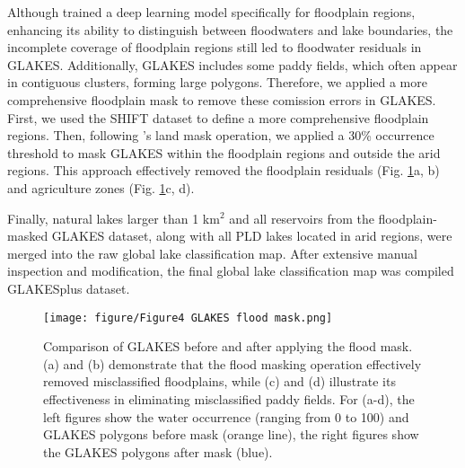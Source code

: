 \documentclass[preprint,12pt,authoryear]{elsarticle}
\begin{document}
Although \citet{pi_mapping_2022} trained a deep learning model specifically  for floodplain regions, enhancing its ability to distinguish between floodwaters and lake boundaries, the incomplete coverage of floodplain regions still led to floodwater residuals in GLAKES. Additionally, GLAKES includes some paddy fields, which often appear in contiguous clusters, forming large polygons. Therefore, we applied a more comprehensive floodplain mask to remove these comission errors in GLAKES. First, we used the SHIFT \citep{zheng_shift_2024} dataset to define a more comprehensive floodplain regions. Then, following \citet{pi_mapping_2022}'s land mask operation, we applied a 30\% occurrence threshold to mask GLAKES within the floodplain regions and outside the arid regions. This approach effectively removed the floodplain residuals (Fig. \ref{fig:Fig4}a, b) and agriculture zones (Fig. \ref{fig:Fig4}c, d). 

Finally, natural lakes larger than 1 km$^2$ and all reservoirs from the floodplain-masked GLAKES dataset, along with all PLD lakes located in arid regions, were merged into the raw global lake classification map. After extensive manual inspection and modification, the final global lake classification map was compiled GLAKESplus dataset.

\begin{figure}[h]
    \centering
    \texttt{[image: figure/Figure4 GLAKES flood mask.png]}
    \caption{Comparison of GLAKES before and after applying the flood mask. (a) and (b) demonstrate that the flood masking operation effectively removed misclassified floodplains, while (c) and (d) illustrate its effectiveness in eliminating misclassified paddy fields. For (a-d), the left figures show the water occurrence (ranging from 0 to 100) and GLAKES polygons before mask (orange line), the right figures show the GLAKES polygons after mask (blue).}
    \label{fig:Fig4}
\end{figure}
\end{document}
